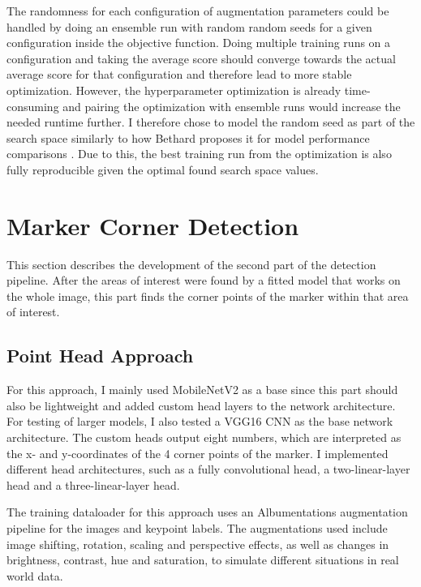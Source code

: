 \documentclass[10pt]{book}
\begin{document}
The randomness for each configuration of augmentation parameters could be handled by %
doing an ensemble run with random random seeds for a given configuration inside the objective function. Doing multiple training runs on a configuration and taking the average score should converge towards the actual average score for that configuration and therefore lead to more stable optimization. However, the hyperparameter optimization is already time-consuming and pairing the optimization with ensemble runs would increase the needed runtime further. I therefore chose to model the random seed as part of the search space similarly to how Bethard proposes it for model performance comparisons \cite{bethard2022need}. Due to this, the best training run from the optimization is also fully reproducible given the optimal found search space values. 

\section{Marker Corner Detection}

This section describes the development of the second part of the detection pipeline. After the areas of interest were found by a fitted model that works on the whole image, this part finds the corner points of the marker within that area of interest.

\subsection{Point Head Approach}

For this approach, I mainly used MobileNetV2 as a base since this part should also be lightweight and added custom head layers to the network architecture. For testing of larger models, I also tested a VGG16 \ac{CNN} as the base network architecture. The custom heads output eight numbers, which are interpreted as the x- and y-coordinates of the 4 corner points of the marker. I implemented different head architectures, such as a fully convolutional head, a two-linear-layer head and a three-linear-layer head.

The training dataloader for this approach uses an Albumentations augmentation pipeline for the images and keypoint labels. The augmentations used include image shifting, rotation, scaling and perspective effects, as well as changes in brightness, contrast, hue and saturation, to simulate different situations in real world data. 
\end{document}
